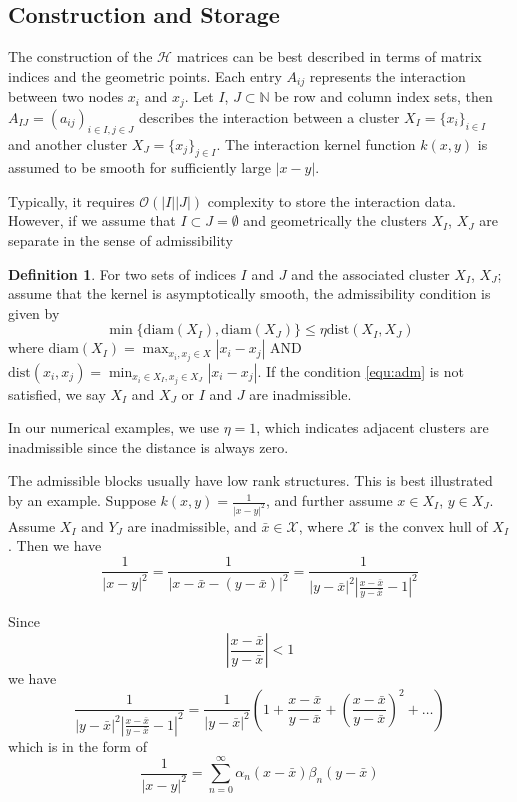 \documentclass[3p,,preprint,12pt]{elsarticle}
\theoremstyle{definition}
\newtheorem{definition}{Definition}[section]
\begin{document}
\subsection{Construction and Storage}\label{equ:cons}

The construction of the $\mathcal{H}$ matrices can be best described in terms of matrix indices and the geometric points. Each entry $A_{ij}$ represents the interaction between two nodes $x_i$ and $x_j$. Let $I$, $J\subset \mathbb{N}$ be row and column index sets, then $A_{IJ}=(a_{ij})_{i\in I, j\in J}$ describes the interaction between a cluster $X_I = \{x_i\}_{i\in I}$ and another cluster $X_J = \{x_j\}_{j\in I}$. The interaction kernel function $k(x,y)$ is assumed to be smooth for sufficiently large $|x-y|$. 

Typically, it requires $\mathcal{O}(|I||J|)$ complexity to store the interaction data. However, if we assume that $I\subset J=\emptyset$ and geometrically the clusters $X_I$, $X_J$ are separate in the sense of admissibility

\begin{definition}
 For two sets of indices $I$ and $J$ and the associated cluster $X_I$, $X_J$; assume that the kernel is asymptotically smooth, the admissibility condition is given by
	\begin{equation}\label{equ:adm}
		\min\{\mathrm{diam}(X_I),\mathrm{diam}(X_J) \}\leq \eta \mathrm{dist}(X_I,X_J)
	\end{equation}
	where $\mathrm{diam}(X_I) = \max_{x_i,x_j\in X}|x_i-x_j|$ AND $\mathrm{dist}(x_i,x_j)=\min_{x_i\in X_I, x_j\in X_J}|x_i-x_j|$. If the condition \cref{equ:adm} is not satisfied, we say $X_I$ and $X_J$ or $I$ and $J$ are inadmissible. 
\end{definition}

In our numerical examples, we use $\eta=1$, which indicates adjacent clusters are inadmissible since the distance is always zero. 

The admissible blocks usually have low rank structures. This is best illustrated by an example. Suppose $k(x,y)=\frac{1}{|x-y|^2}$, and further assume $x\in X_I$, $y\in X_J$. Assume $X_I$ and $Y_J$ are inadmissible, and $\bar x\in \mathcal{X}$, where $\mathcal{X}$ is the convex hull of $X_I$. Then we have
\[\frac{1}{{|x - y{|^2}}} = \frac{1}{{|x - \bar x - (y - \bar x){|^2}}} = \frac{1}{{|y - \bar x{|^2}{{\left| {\frac{{x - \bar x}}{{y - \bar x}} - 1} \right|}^2}}}\]

Since 
\[\left| {\frac{{x - \bar x}}{{y - \bar x}}} \right| < 1\]
we have 
\[\frac{1}{{|y - \bar x{|^2}{{\left| {\frac{{x - \bar x}}{{y - \bar x}} - 1} \right|}^2}}} = \frac{1}{{|y - \bar x{|^2}}}\left( {1 + \frac{{x - \bar x}}{{y - \bar x}} + {{\left( {\frac{{x - \bar x}}{{y - \bar x}}} \right)}^2} +  \ldots } \right)\]
which is in the form of 
\begin{equation}
	\frac{1}{{|x - y{|^2}}} = \sum_{n=0}^\infty \alpha_n(x-\bar x)\beta_n(y-\bar x)
\end{equation}
\end{document}
